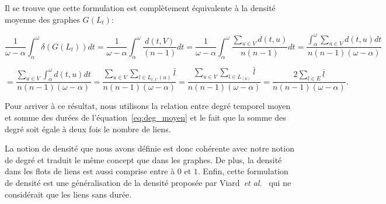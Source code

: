 Il se trouve que cette formulation est complètement équivalente à la densité moyenne des graphes $G(L_t)$:

\begin{equation*}
\dfrac{1}{\omega-\alpha} \int_{\alpha}^{\omega} \delta(G(L_t)) dt=
\dfrac{1}{\omega-\alpha} \int_{\alpha}^{\omega} \dfrac{d(t,V)}{(n-1)}dt=
 \dfrac{1}{\omega-\alpha} \int_{\alpha}^{\omega} \dfrac{\sum_{u \in V} d(t,u)}{n(n-1)}dt = 
 \dfrac{\int_{\alpha}^{\omega} \sum_{u \in V} d(t,u)dt}{n(n-1)(\omega-\alpha)} 
 \end{equation*}

 \begin{equation*}
 =
\dfrac{\sum_{u \in V} \int_{\alpha}^{\omega}d(t,u)dt}{n(n-1)(\omega-\alpha)} =
\dfrac{\sum_{u \in V} \sum_{l \in L_{t..t'}(u)} \bar{l}}{n(n-1)(\omega-\alpha)} =
\dfrac{\sum_{u \in V} \sum_{l \in L_(u)} \bar{l}}{n(n-1)(\omega-\alpha)}=
\dfrac{2\sum_{l \in E}\bar{l}}{n(n-1) (\omega-\alpha)} .
\end{equation*}

Pour arriver à ce résultat, nous utilisons la relation entre degré temporel moyen et somme des durées de l'équation~\ref{eq:deg_moyen} et le fait que la somme des degré soit égale à deux fois le nombre de liens.

La notion de densité que nous avons définie est donc cohérente avec notre notion de degré et traduit le même concept que dans les graphes.
De plus, la densité dans les flots de liens est aussi comprise entre à $0$ et $1$.
Enfin, cette formulation de densité est une généralisation de la densité proposée par Viard~\emph{et al.}~\cite{Viard2014a} qui ne considérait que les liens sans durée.


